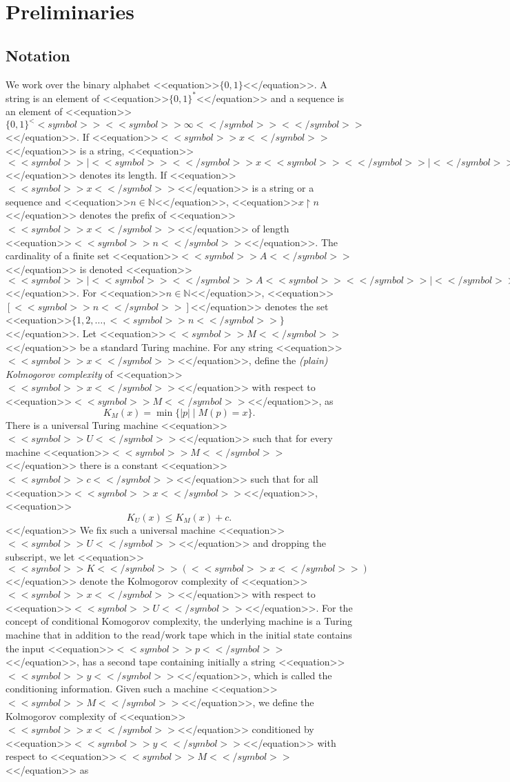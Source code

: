 \documentclass[proceedings]{stacs}
\newcommand{\nat}{{\mathbb N}}
\newcommand{\rest}{{\upharpoonright}}
\begin{document}
\section{Preliminaries}
\label{s:prelim}
\subsection{Notation}
We work over the binary alphabet <<equation>>$\{0,1\}$<</equation>>. A string is an element of <<equation>>$\{0,1\}^*$<</equation>> and a sequence is an element of <<equation>>$\{0,1\}^<<symbol>><<symbol>>{\infty}<</symbol>><</symbol>>$<</equation>>. If <<equation>>$<<symbol>>x<</symbol>>$<</equation>> is a string, <<equation>>$<<symbol>>|<<symbol>><</symbol>>x<<symbol>><</symbol>>|<</symbol>>$<</equation>> denotes its length. If <<equation>>$<<symbol>>x<</symbol>>$<</equation>> is a string or a sequence and <<equation>>$n \in \nat$<</equation>>, <<equation>>$x \rest n$<</equation>> denotes the prefix of <<equation>>$<<symbol>>x<</symbol>>$<</equation>> of length <<equation>>$<<symbol>>n<</symbol>>$<</equation>>. The cardinality of a finite set <<equation>>$<<symbol>>A<</symbol>>$<</equation>> is denoted <<equation>>$<<symbol>>|<<symbol>><</symbol>>A<<symbol>><</symbol>>|<</symbol>>$<</equation>>. For <<equation>>$n \in \nat$<</equation>>, <<equation>>$[<<symbol>>n<</symbol>>]$<</equation>> denotes the set <<equation>>$\{1,2, \ldots, <<symbol>>n<</symbol>>\}$<</equation>>. Let <<equation>>$<<symbol>>M<</symbol>>$<</equation>> be a standard Turing machine. For any string <<equation>>$<<symbol>>x<</symbol>>$<</equation>>, define the \emph{(plain) Kolmogorov complexity} of <<equation>>$<<symbol>>x<</symbol>>$<</equation>> with respect to <<equation>>$<<symbol>>M<</symbol>>$<</equation>>, as 
\[K_M(x) = \min \{ |p| \mid M(p) = x \}.
\]
 There is a universal Turing machine <<equation>>$<<symbol>>U<</symbol>>$<</equation>> such that for every machine <<equation>>$<<symbol>>M<</symbol>>$<</equation>> there is a constant <<equation>>$<<symbol>>c<</symbol>>$<</equation>> such that for all <<equation>>$<<symbol>>x<</symbol>>$<</equation>>,
<<equation>>\begin{equation}
\label{e:univ}
K_U(x) \leq K_M(x) + c.
\end{equation}<</equation>>
We fix such a universal machine <<equation>>$<<symbol>>U<</symbol>>$<</equation>> and dropping the subscript, we let <<equation>>$<<symbol>>K<</symbol>>(<<symbol>>x<</symbol>>)$<</equation>> denote the Kolmogorov complexity of <<equation>>$<<symbol>>x<</symbol>>$<</equation>> with respect to <<equation>>$<<symbol>>U<</symbol>>$<</equation>>. For the concept of conditional Komogorov complexity, the underlying machine is a Turing machine that in addition to the read/work tape which in the initial state contains the input <<equation>>$<<symbol>>p<</symbol>>$<</equation>>, has a second tape containing initially a string <<equation>>$<<symbol>>y<</symbol>>$<</equation>>, which is called the conditioning information. Given such a machine <<equation>>$<<symbol>>M<</symbol>>$<</equation>>, we define the Kolmogorov complexity of <<equation>>$<<symbol>>x<</symbol>>$<</equation>> conditioned by <<equation>>$<<symbol>>y<</symbol>>$<</equation>> with respect to <<equation>>$<<symbol>>M<</symbol>>$<</equation>> as 
\end{document}
